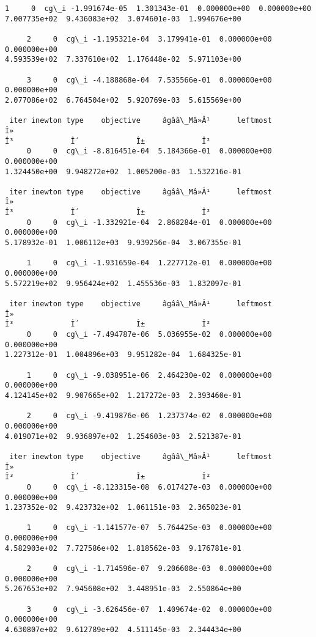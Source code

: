 \begin{Verbatim}[commandchars=\\\{\}]
     1     0  cg\_i -1.991674e-05  1.301343e-01  0.000000e+00  0.000000e+00
7.007735e+02  9.436083e+02  3.074601e-03  1.994676e+00

     2     0  cg\_i -1.195321e-04  3.179941e-01  0.000000e+00  0.000000e+00
4.593539e+02  7.337610e+02  1.176448e-02  5.971103e+00

     3     0  cg\_i -4.188868e-04  7.535566e-01  0.000000e+00  0.000000e+00
2.077086e+02  6.764504e+02  5.920769e-03  5.615569e+00

 iter inewton type    objective     âgââ\_Mâ»Â¹      leftmost         Î»
Î³             Î´             Î±             Î²
     0     0  cg\_i -8.816451e-04  5.184366e-01  0.000000e+00  0.000000e+00
1.324450e+00  9.948272e+02  1.005200e-03  1.532216e-01

 iter inewton type    objective     âgââ\_Mâ»Â¹      leftmost         Î»
Î³             Î´             Î±             Î²
     0     0  cg\_i -1.332921e-04  2.868284e-01  0.000000e+00  0.000000e+00
5.178932e-01  1.006112e+03  9.939256e-04  3.067355e-01

     1     0  cg\_i -1.931659e-04  1.227712e-01  0.000000e+00  0.000000e+00
5.572219e+02  9.956424e+02  1.455536e-03  1.832097e-01

 iter inewton type    objective     âgââ\_Mâ»Â¹      leftmost         Î»
Î³             Î´             Î±             Î²
     0     0  cg\_i -7.494787e-06  5.036955e-02  0.000000e+00  0.000000e+00
1.227312e-01  1.004896e+03  9.951282e-04  1.684325e-01

     1     0  cg\_i -9.038951e-06  2.464230e-02  0.000000e+00  0.000000e+00
4.124145e+02  9.907665e+02  1.217272e-03  2.393460e-01

     2     0  cg\_i -9.419876e-06  1.237374e-02  0.000000e+00  0.000000e+00
4.019071e+02  9.936897e+02  1.254603e-03  2.521387e-01

 iter inewton type    objective     âgââ\_Mâ»Â¹      leftmost         Î»
Î³             Î´             Î±             Î²
     0     0  cg\_i -8.123315e-08  6.017427e-03  0.000000e+00  0.000000e+00
1.237352e-02  9.423732e+02  1.061151e-03  2.365023e-01

     1     0  cg\_i -1.141577e-07  5.764425e-03  0.000000e+00  0.000000e+00
4.582903e+02  7.727586e+02  1.818562e-03  9.176781e-01

     2     0  cg\_i -1.714596e-07  9.206608e-03  0.000000e+00  0.000000e+00
5.267653e+02  7.945608e+02  3.448951e-03  2.550864e+00

     3     0  cg\_i -3.626456e-07  1.409674e-02  0.000000e+00  0.000000e+00
4.630807e+02  9.612789e+02  4.511145e-03  2.344434e+00


\end{Verbatim}
